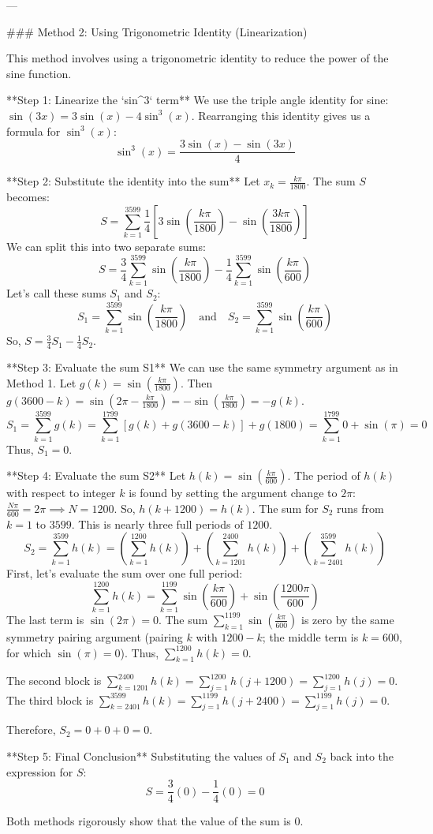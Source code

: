 ---

### Method 2: Using Trigonometric Identity (Linearization)

This method involves using a trigonometric identity to reduce the power of the sine function.

**Step 1: Linearize the `sin^3` term**
We use the triple angle identity for sine: $\sin(3x) = 3\sin(x) - 4\sin^3(x)$.
Rearranging this identity gives us a formula for $\sin^3(x)$:
$$\sin^3(x) = \frac{3\sin(x) - \sin(3x)}{4}$$

**Step 2: Substitute the identity into the sum**
Let $x_k = \frac{k\pi}{1800}$. The sum $S$ becomes:
$$S = \sum_{k=1}^{3599} \frac{1}{4}\left[3\sin\left(\frac{k\pi}{1800}\right) - \sin\left(\frac{3k\pi}{1800}\right)\right]$$
We can split this into two separate sums:
$$S = \frac{3}{4}\sum_{k=1}^{3599} \sin\left(\frac{k\pi}{1800}\right) - \frac{1}{4}\sum_{k=1}^{3599} \sin\left(\frac{k\pi}{600}\right)$$
Let's call these sums $S_1$ and $S_2$:
$$S_1 = \sum_{k=1}^{3599} \sin\left(\frac{k\pi}{1800}\right) \quad \text{and} \quad S_2 = \sum_{k=1}^{3599} \sin\left(\frac{k\pi}{600}\right)$$
So, $S = \frac{3}{4}S_1 - \frac{1}{4}S_2$.

**Step 3: Evaluate the sum S1**
We can use the same symmetry argument as in Method 1. Let $g(k) = \sin\left(\frac{k\pi}{1800}\right)$.
Then $g(3600-k) = \sin\left(2\pi - \frac{k\pi}{1800}\right) = -\sin\left(\frac{k\pi}{1800}\right) = -g(k)$.
$$S_1 = \sum_{k=1}^{3599} g(k) = \sum_{k=1}^{1799} [g(k) + g(3600-k)] + g(1800) = \sum_{k=1}^{1799} 0 + \sin(\pi) = 0$$
Thus, $S_1 = 0$.

**Step 4: Evaluate the sum S2**
Let $h(k) = \sin\left(\frac{k\pi}{600}\right)$. The period of $h(k)$ with respect to integer $k$ is found by setting the argument change to $2\pi$: $\frac{N\pi}{600} = 2\pi \implies N=1200$. So, $h(k+1200) = h(k)$.
The sum for $S_2$ runs from $k=1$ to $3599$. This is nearly three full periods of $1200$.
$$S_2 = \sum_{k=1}^{3599} h(k) = \left(\sum_{k=1}^{1200} h(k)\right) + \left(\sum_{k=1201}^{2400} h(k)\right) + \left(\sum_{k=2401}^{3599} h(k)\right)$$
First, let's evaluate the sum over one full period:
$$\sum_{k=1}^{1200} h(k) = \sum_{k=1}^{1199} \sin\left(\frac{k\pi}{600}\right) + \sin\left(\frac{1200\pi}{600}\right)$$
The last term is $\sin(2\pi) = 0$. The sum $\sum_{k=1}^{1199} \sin\left(\frac{k\pi}{600}\right)$ is zero by the same symmetry pairing argument (pairing $k$ with $1200-k$; the middle term is $k=600$, for which $\sin(\pi)=0$). Thus, $\sum_{k=1}^{1200} h(k) = 0$.

The second block is $\sum_{k=1201}^{2400} h(k) = \sum_{j=1}^{1200} h(j+1200) = \sum_{j=1}^{1200} h(j) = 0$.
The third block is $\sum_{k=2401}^{3599} h(k) = \sum_{j=1}^{1199} h(j+2400) = \sum_{j=1}^{1199} h(j) = 0$.

Therefore, $S_2 = 0 + 0 + 0 = 0$.

**Step 5: Final Conclusion**
Substituting the values of $S_1$ and $S_2$ back into the expression for $S$:
$$S = \frac{3}{4}(0) - \frac{1}{4}(0) = 0$$

Both methods rigorously show that the value of the sum is 0.